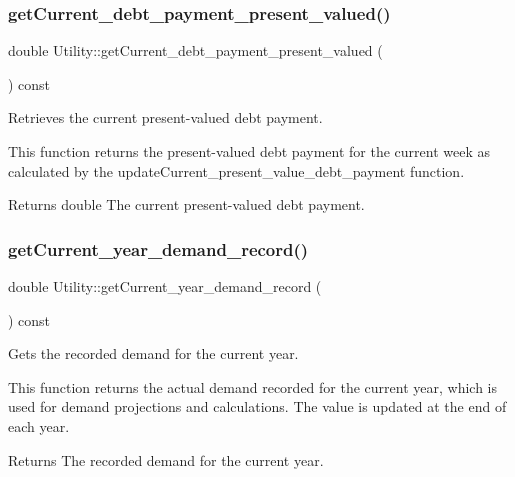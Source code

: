 \subsubsection{\texorpdfstring{get\+Current\+\_\+debt\+\_\+payment\+\_\+present\+\_\+valued()}{getCurrent\_debt\_payment\_present\_valued()}}
{\footnotesize\ttfamily double Utility\+::get\+Current\+\_\+debt\+\_\+payment\+\_\+present\+\_\+valued (\begin{DoxyParamCaption}{ }\end{DoxyParamCaption}) const}



Retrieves the current present-\/valued debt payment. 

This function returns the present-\/valued debt payment for the current week as calculated by the update\+Current\+\_\+present\+\_\+value\+\_\+debt\+\_\+payment function.

\begin{DoxyReturn}{Returns}
double The current present-\/valued debt payment. 
\end{DoxyReturn}
\mbox{\label{classUtility_a67627ab2e5f526a979099bb6b2d2f13f}} 
\subsubsection{\texorpdfstring{get\+Current\+\_\+year\+\_\+demand\+\_\+record()}{getCurrent\_year\_demand\_record()}}
{\footnotesize\ttfamily double Utility\+::get\+Current\+\_\+year\+\_\+demand\+\_\+record (\begin{DoxyParamCaption}{ }\end{DoxyParamCaption}) const}



Gets the recorded demand for the current year. 

This function returns the actual demand recorded for the current year, which is used for demand projections and calculations. The value is updated at the end of each year.

\begin{DoxyReturn}{Returns}
The recorded demand for the current year. 
\end{DoxyReturn}
\mbox{\label{classUtility_ab62d06b45773fb9e5574a339ac0c449e}} 
